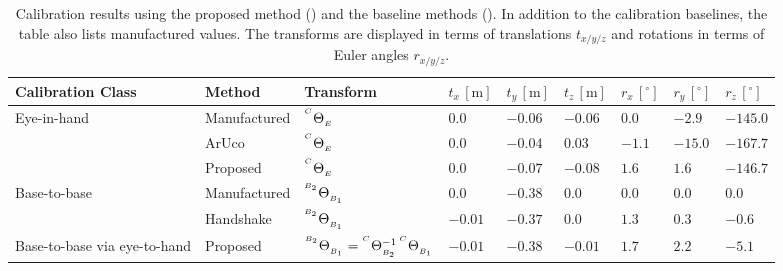 \begin{landscape}
\begin{table}[htb]
\caption{Calibration results using the proposed method () and the baseline methods (). In addition to the calibration baselines, the table also lists manufactured values. The transforms are displayed in terms of translations $t_{x/y/z}$ and rotations in terms of Euler angles $r_{x/y/z}$.}
\label{c1:tab:calibration_results}
\centering
\begin{tabular}{|l|l|l|l|l|l|l|l|l|}
\hline
Calibration Class             & Method       & Transform                                                                                                        & $t_x\,[\text{m}]$ & $t_y\,[\text{m}]$ & $t_z\,[\text{m}]$ & $r_x\,[^\circ]$ & $r_y\,[^\circ]$ & $r_z\,[^\circ]$ \\ \hline
\multirow{3}{*}{Eye-in-hand}  & Manufactured & ${}^{^C}\Theta_{_E}$                                                                                  & $ 0.0$            & $-0.06$           & $-0.06$           & $ 0.0$          & $-2.9$          & $-145.0$        \\ \cline{2-9} 
                              & ArUco        & ${}^{^C}\Theta_{_E}$                                                                                  & $ 0.0$            & $-0.04$           & $ 0.03$           & $-1.1$          & $-15.0$         & $-167.7$        \\ \cline{2-9} 
                              & Proposed     & ${}^{^C}\Theta_{_E}$                                                                                  & $ 0.0$            & $-0.07$           & $-0.08$           & $ 1.6$          & $ 1.6$          & $-146.7$        \\ \hline
\multirow{2}{*}{Base-to-base} & Manufactured & ${}^{^{B_2}}\Theta_{_{B_1}}$                                                                           & $ 0.0$            & $-0.38$           & $ 0.0$            & $0.0$           & $0.0$           & $ 0.0$          \\ \cline{2-9}
                              & Handshake    & ${}^{^{B_2}}\Theta_{_{B_1}}$                                                                           & $-0.01$           & $-0.37$           & $ 0.0$            & $1.3$           & $0.3$           & $-0.6$          \\ \hline
Base-to-base via eye-to-hand  & Proposed     & ${}^{^{B_2}}\Theta_{_{B_1}} = {}^{^C}\Theta_{_{B_2}}^{-1}\,{}^{^C}\Theta_{_{B_1}}$ & $-0.01$           & $-0.38$           & $-0.01$           & $1.7$           & $2.2$           & $-5.1$          \\ \hline
\end{tabular}
\end{table}
\end{landscape}

